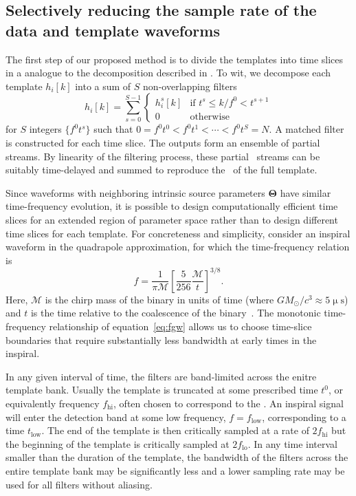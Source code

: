 \subsection{Selectively reducing the sample rate of the data and template waveforms}

The first step of our proposed method is to divide the templates into time
slices in a \TD{} analogue to the \FD{} decomposition described
in \citet{Marion2004, Buskulic2010}.  To wit, we decompose each template
$h_{i}[k]$ into a sum of $S$ non-overlapping filters
%
\begin{equation}
\label{eq:time-slices}
h_{i}[k] = \sum_{s=0}^{S-1}
	\begin{cases}
		h_i^s[k] & \textrm{if } t^s \leqslant k / f^0 < t^{s+1} \\
		0 & \textrm{otherwise}
	\end{cases}
\end{equation}
%
for $S$ integers $\{f^0 t^s\}$ such that $0  = f^0 t^0 < f^0 t^1 < \cdots < f^0
t^S = N$.  A matched filter is constructed for each time slice.  The outputs
form an ensemble of partial \SNR{} streams.  By linearity of the filtering
process, these partial \SNR\ streams can be suitably time-delayed and summed to
 reproduce the \SNR\ of the full template.

Since waveforms with neighboring intrinsic source parameters $\mathbf\Theta$
 have similar time-frequency evolution, it is possible to design computationally
efficient time slices for an extended region of parameter space rather than to
design different time slices for each template.
For concreteness and simplicity, consider an inspiral waveform in the
quadrapole approximation, for which the time-frequency relation is
%
\begin{equation} \label{eq:fgw}
%
f = \frac{1}{\mathcal{\pi M}} \left[ \frac{5}{256}\frac{\mathcal{M}}{t}
\right]^{3/8}.
%
\end{equation}
%
Here, $\mathcal{M}$ is the chirp mass of the binary in units of time (where $G
M_\odot / c^3 \approx 5 \upmu\mathrm{s}$) and $t$ is the time relative to the
coalescence of the binary~\citep{findchirppaper, kidder1992}.
The monotonic time-frequency relationship of equation~\eqref{eq:fgw} allows us
to choose time-slice boundaries that require substantially less bandwidth at
early times in the inspiral.

In any given interval of time, the filters are band-limited across the enitre
template bank. Usually the template is truncated at some prescribed time $t^0$,
or equivalently frequency $f_\mathrm{hi}$, often chosen to correspond to the
\ISCO. An inspiral signal will enter the detection band at some low frequency,
$f = f_\mathrm{low}$, corresponding to a time $t_\mathrm{low}$.  The end of the
template is then critically sampled at a rate of $2 f_\mathrm{hi}$ but the 
beginning of the template is critically sampled at $2 f_\mathrm{lo}$. In any
time interval smaller than the duration of the template, the bandwidth of the
filters across the entire template bank may be significantly less and
a lower sampling rate may be used for all filters without aliasing.

